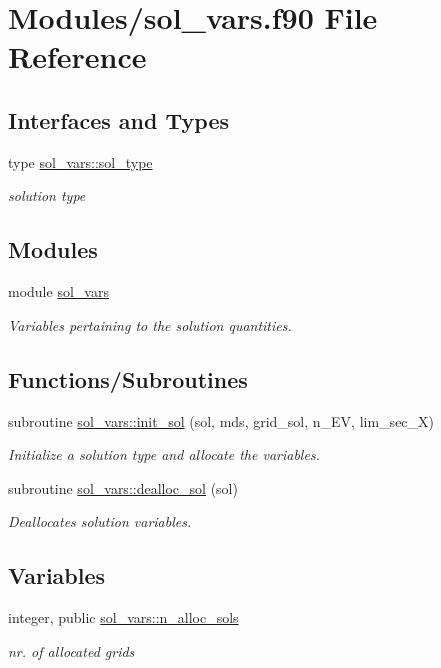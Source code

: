 \hypertarget{sol__vars_8f90}{}\section{Modules/sol\+\_\+vars.f90 File Reference}
\label{sol__vars_8f90}
\subsection*{Interfaces and Types}
\begin{DoxyCompactItemize}
\item 
type \hyperlink{structsol__vars_1_1sol__type}{sol\+\_\+vars\+::sol\+\_\+type}
\begin{DoxyCompactList}\small\item\em solution type \end{DoxyCompactList}\end{DoxyCompactItemize}
\subsection*{Modules}
\begin{DoxyCompactItemize}
\item 
module \hyperlink{namespacesol__vars}{sol\+\_\+vars}
\begin{DoxyCompactList}\small\item\em Variables pertaining to the solution quantities. \end{DoxyCompactList}\end{DoxyCompactItemize}
\subsection*{Functions/\+Subroutines}
\begin{DoxyCompactItemize}
\item 
subroutine \hyperlink{namespacesol__vars_a05d1378774a44f53c9643bdacc5bee4a}{sol\+\_\+vars\+::init\+\_\+sol} (sol, mds, grid\+\_\+sol, n\+\_\+\+EV, lim\+\_\+sec\+\_\+X)
\begin{DoxyCompactList}\small\item\em Initialize a solution type and allocate the variables. \end{DoxyCompactList}\item 
subroutine \hyperlink{namespacesol__vars_a9ae65a5252aede548e5238e50c1bb2ba}{sol\+\_\+vars\+::dealloc\+\_\+sol} (sol)
\begin{DoxyCompactList}\small\item\em Deallocates solution variables. \end{DoxyCompactList}\end{DoxyCompactItemize}
\subsection*{Variables}
\begin{DoxyCompactItemize}
\item 
integer, public \hyperlink{namespacesol__vars_a91634d69ba45b896816f40e9013ddc79}{sol\+\_\+vars\+::n\+\_\+alloc\+\_\+sols}
\begin{DoxyCompactList}\small\item\em nr. of allocated grids \end{DoxyCompactList}\end{DoxyCompactItemize}
